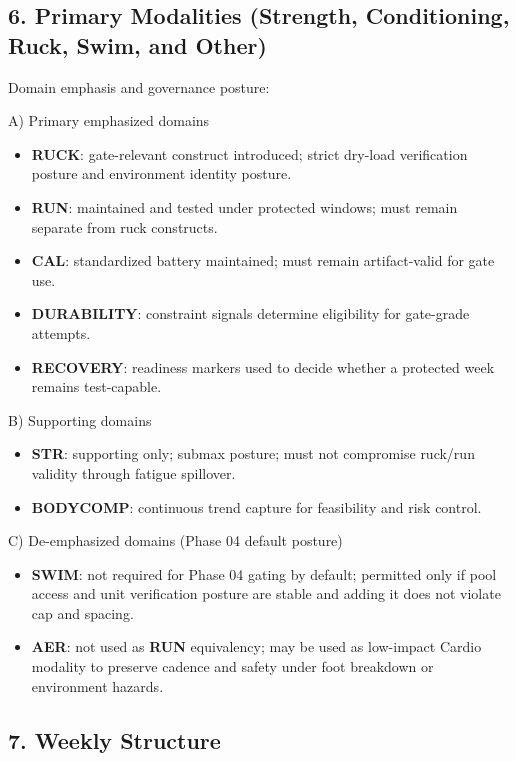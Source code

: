 \documentclass[10pt]{article}
\begin{document}
\subsection*{6. Primary Modalities (Strength, Conditioning, Ruck, Swim, and Other)}


Domain emphasis and governance posture:

A) Primary emphasized domains

\begin{itemize}
\item \textbf{RUCK}: gate-relevant construct introduced; strict dry-load verification posture and environment identity posture.
\item \textbf{RUN}: maintained and tested under protected windows; must remain separate from ruck constructs.
\item \textbf{CAL}: standardized battery maintained; must remain artifact-valid for gate use.
\item \textbf{DURABILITY}: constraint signals determine eligibility for gate-grade attempts.
\item \textbf{RECOVERY}: readiness markers used to decide whether a protected week remains test-capable.
\end{itemize}

B) Supporting domains

\begin{itemize}
\item \textbf{STR}: supporting only; submax posture; must not compromise ruck/run validity through fatigue spillover.
\item \textbf{BODYCOMP}: continuous trend capture for feasibility and risk control.
\end{itemize}

C) De-emphasized domains (Phase 04 default posture)

\begin{itemize}
\item \textbf{SWIM}: not required for Phase 04 gating by default; permitted only if pool access and unit verification posture are stable and adding it does not violate cap and spacing.
\item \textbf{AER}: not used as \textbf{RUN} equivalency; may be used as low-impact Cardio modality to preserve cadence and safety under foot breakdown or environment hazards.
\end{itemize}

\subsection*{7. Weekly Structure}
\end{document}
